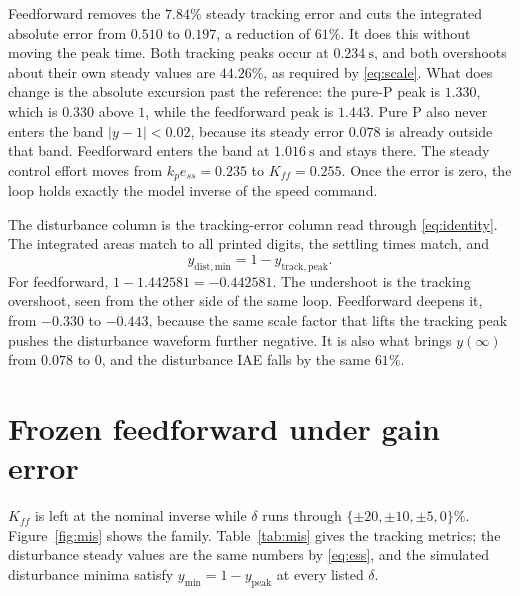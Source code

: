 \documentclass[12pt,a4paper]{article}
\begin{document}
Feedforward removes the \(7.84\%\) steady tracking error and cuts the integrated absolute error from \(0.510\) to \(0.197\), a reduction of \(61\%\).
It does this without moving the peak time. Both tracking peaks occur at \(0.234~\mathrm{s}\), and both overshoots about their own steady values are \(44.26\%\), as required by \eqref{eq:scale}.
What does change is the absolute excursion past the reference: the pure-P peak is \(1.330\), which is \(0.330\) above \(1\), while the feedforward peak is \(1.443\).
Pure P also never enters the band \(|y-1|<0.02\), because its steady error \(0.078\) is already outside that band. Feedforward enters the band at \(1.016~\mathrm{s}\) and stays there.
The steady control effort moves from \(k_p e_{ss}=0.235\) to \(K_{ff}=0.255\). Once the error is zero, the loop holds exactly the model inverse of the speed command.

The disturbance column is the tracking-error column read through \eqref{eq:identity}.
The integrated areas match to all printed digits, the settling times match, and
\[
  y_{\mathrm{dist,min}}=1-y_{\mathrm{track,peak}}.
\]
For feedforward, \(1-1.442581=-0.442581\).
The undershoot is the tracking overshoot, seen from the other side of the same loop.
Feedforward deepens it, from \(-0.330\) to \(-0.443\), because the same scale factor that lifts the tracking peak pushes the disturbance waveform further negative. It is also what brings \(y(\infty)\) from \(0.078\) to \(0\), and the disturbance IAE falls by the same \(61\%\).

\section{Frozen feedforward under gain error}
\label{sec:mismatch}

\(K_{ff}\) is left at the nominal inverse while \(\delta\) runs through \(\{\pm 20,\pm 10,\pm 5,0\}\%\).
Figure~\ref{fig:mis} shows the family. Table~\ref{tab:mis} gives the tracking metrics; the disturbance steady values are the same numbers by \eqref{eq:ess}, and the simulated disturbance minima satisfy \(y_{\min}=1-y_{\mathrm{peak}}\) at every listed \(\delta\).
\end{document}
